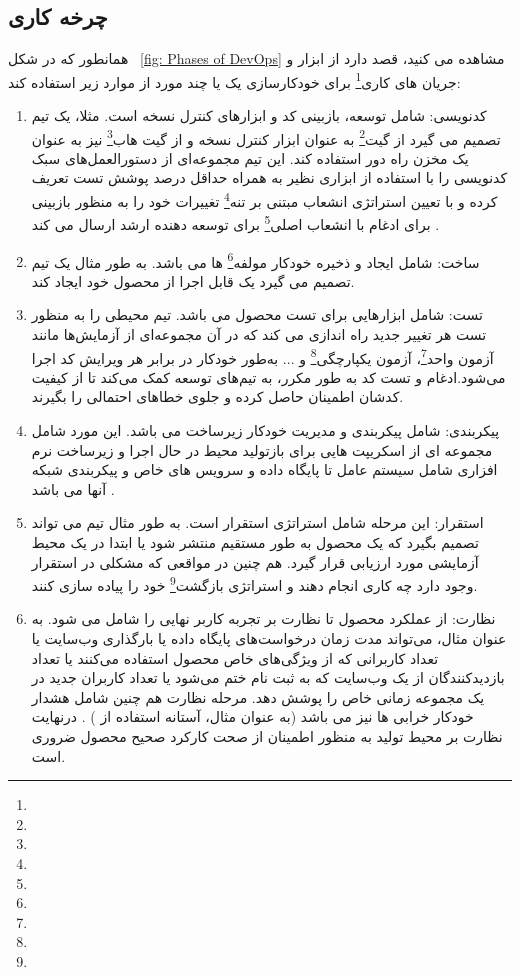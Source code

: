 \subsection{چرخه کاری }
همانطور که در شکل 
~\ref{fig: Phases of DevOps}
مشاهده می کنید،
قصد دارد از ابزار و جریان های کاری\footnote{} برای خودکارسازی یک یا چند مورد از موارد زیر استفاده کند: 
\begin{enumerate}
	\item
کدنویسی: شامل توسعه، بازبینی کد و ابزارهای کنترل نسخه است. مثلا، یک تیم تصمیم می گیرد از گیت\footnote{} به عنوان ابزار کنترل نسخه و از گیت هاب\footnote{} نیز به عنوان یک مخزن راه دور استفاده کند. این تیم مجموعه‌ای از دستورالعمل‌های سبک کدنویسی را با استفاده از ابزاری نظیر  به همراه حداقل درصد پوشش تست تعریف کرده و با تعیین استراتژی انشعاب مبتنی بر تنه\footnote{} تغییرات خود را به منظور بازبینی برای ادغام با انشعاب اصلی\footnote{} برای توسعه دهنده ارشد ارسال می کند \cite{Devopstrunk}.
	\item 
ساخت: شامل ایجاد و ذخیره خودکار مولفه\footnote{} ها می باشد. به طور مثال یک تیم تصمیم می گیرد یک  قابل اجرا از محصول خود ایجاد کند.
	\item 
تست: شامل ابزارهایی برای تست محصول می باشد. تیم محیطی را به منظور تست هر تغییر جدید راه اندازی می کند که در آن مجموعه‌ای از آزمایش‌ها مانند آزمون واحد\footnote{}، آزمون یکپارچگی\footnote{} و ... به‌طور خودکار در برابر هر ویرایش کد اجرا می‌شود.ادغام و تست کد به طور مکرر، به تیم‌های توسعه کمک می‌کند تا از کیفیت کدشان اطمینان حاصل کرده و جلوی خطاهای احتمالی را بگیرند.
	\item 
	پیکربندی: شامل پیکربندی و مدیریت خودکار زیرساخت می باشد. این مورد شامل مجموعه ای از اسکریپت هایی برای بازتولید محیط در حال اجرا و زیرساخت نرم افزاری شامل سیستم عامل تا پایگاه داده و سرویس های خاص و پیکربندی شبکه آنها می باشد \cite{DevopsIaac1, DevopsIaac2}.
	\item 
استقرار: این مرحله شامل استراتژی استقرار است. به طور مثال تیم می تواند تصمیم بگیرد که یک محصول به طور مستقیم منتشر شود یا ابتدا در یک محیط آزمایشی مورد ارزیابی قرار گیرد. هم چنین در مواقعی که مشکلی در استقرار وجود دارد چه کاری انجام دهند و استراتژی بازگشت\footnote{} خود را پیاده سازی کنند.
	\item 
نظارت: از عملکرد محصول تا نظارت بر تجربه کاربر نهایی را شامل می شود. به عنوان مثال، می‌تواند مدت زمان درخواست‌های پایگاه داده یا بارگذاری وب‌سایت یا تعداد کاربرانی که از ویژگی‌های خاص محصول استفاده می‌کنند یا تعداد بازدیدکنندگان از یک وب‌سایت که به ثبت نام ختم می‌شود یا تعداد کاربران جدید در یک مجموعه زمانی خاص را پوشش دهد. مرحله نظارت هم چنین شامل هشدار خودکار خرابی ها نیز می باشد (به عنوان مثال، آستانه استفاده از ) \cite{DevopsMonitor}. درنهایت نظارت بر محیط تولید به منظور اطمینان از صحت کارکرد صحیح محصول ضروری است.
\end{enumerate}

